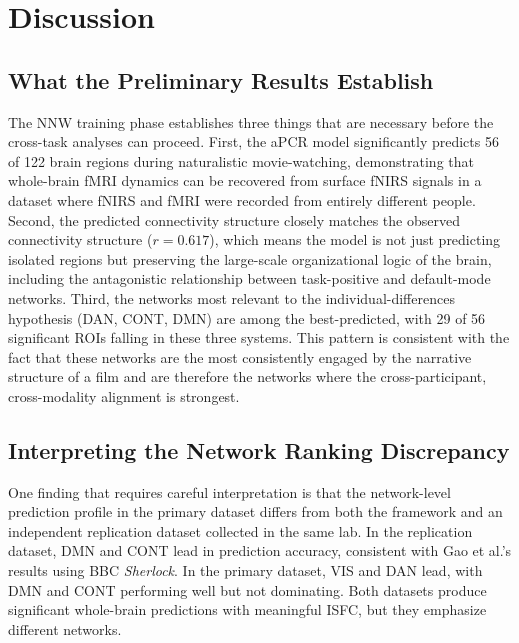 
\section{Discussion}

\subsection{What the Preliminary Results Establish}

The NNW training phase establishes three things that are necessary before the cross-task analyses can proceed. First, the aPCR model significantly predicts 56 of 122 brain regions during naturalistic movie-watching, demonstrating that whole-brain fMRI dynamics can be recovered from surface fNIRS signals in a dataset where fNIRS and fMRI were recorded from entirely different people. Second, the predicted connectivity structure closely matches the observed connectivity structure ($r = 0.617$), which means the model is not just predicting isolated regions but preserving the large-scale organizational logic of the brain, including the antagonistic relationship between task-positive and default-mode networks. Third, the networks most relevant to the individual-differences hypothesis (DAN, CONT, DMN) are among the best-predicted, with 29 of 56 significant ROIs falling in these three systems. This pattern is consistent with the fact that these networks are the most consistently engaged by the narrative structure of a film \citep{hasson2010} and are therefore the networks where the cross-participant, cross-modality alignment is strongest.

\subsection{Interpreting the Network Ranking Discrepancy}

One finding that requires careful interpretation is that the network-level prediction profile in the primary dataset differs from both the \citet{gao2025} framework and an independent replication dataset collected in the same lab. In the replication dataset, DMN and CONT lead in prediction accuracy, consistent with Gao et al.'s results using BBC \textit{Sherlock}. In the primary dataset, VIS and DAN lead, with DMN and CONT performing well but not dominating. Both datasets produce significant whole-brain predictions with meaningful ISFC, but they emphasize different networks.

